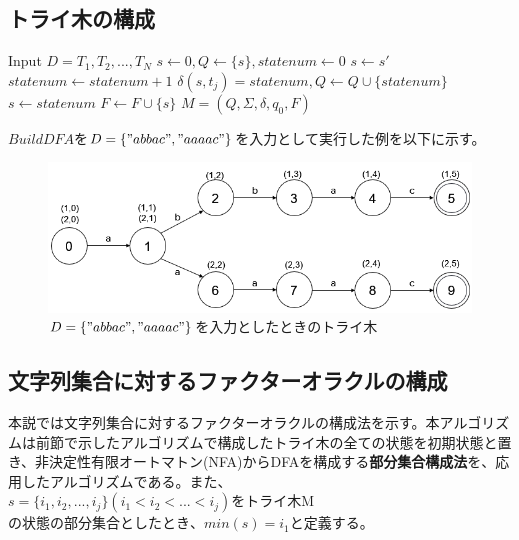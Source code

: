 \documentclass[11pt,a4paper]{jreport}
\begin{document}
  \subsection{トライ木の構成}

  \begin{algorithm}
    \caption{$\textbf{BuildDFA}(D)$}
    \label{alg4}
    \begin{algorithmic}[1]
      \State Input $D={T_1,T_2,...,T_N}$
      \State $s \leftarrow 0,Q \leftarrow \{s\}, statenum \leftarrow 0$
          \State $s \leftarrow s'$
          \Else
          \State $statenum \leftarrow statenum+1$
          \State $\delta(s,t_j)=statenum,Q \leftarrow Q \cup \{statenum\}$
          \State $s \leftarrow statenum$
          \EndIf
        \EndFor
        \State $F \leftarrow F \cup \{s\}$
      \EndFor
      \Return $M = (Q, \Sigma, \delta, q_0, F)$
    \end{algorithmic}
  \end{algorithm}
  \newpage

  $BuildDFA$を$D=\{"abbac", "aaaac"\}$を入力として実行した例を以下に示す。

  \begin{figure}[htbp]
    \centering
    \includegraphics[width=15cm]{trie.png}
    \caption{$D=\{"abbac", "aaaac"\}$を入力としたときのトライ木}
  \end{figure}
  
  \subsection{文字列集合に対するファクターオラクルの構成}
  本説では文字列集合に対するファクターオラクルの構成法を示す。本アルゴリズムは前節で示したアルゴリズムで構成したトライ木の全ての状態を初期状態と置き、非決定性有限オートマトン(NFA)からDFAを構成する\textbf{部分集合構成法}を、応用したアルゴリズムである。また、$s=\{i_1,i_2,...,i_j\}(i_1<i_2<...<i_j)をトライ木$M$の状態の部分集合としたとき、min(s)=i_1$と定義する。%
\end{document}
